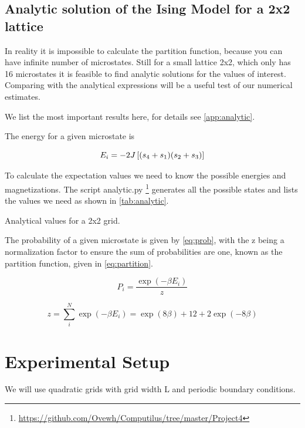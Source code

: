 \subsection{Analytic solution of the Ising Model for a 2x2 lattice}
In reality it is impossible to calculate the partition function, because you can
have infinite number of microstates. Still for a small lattice 2x2, which only
has 16 microstates it is
feasible to find analytic solutions for the values of
interest. Comparing with the analytical expressions will be a useful test of our
numerical estimates.

We list the most important results here, for details see \cref{app:analytic}.

The energy for a given microstate is

\begin{equation}
  E_i = -2J\left[(s_4 + s_1)(s_2+s_3)\right]
\end{equation}

To calculate the expectation values we need to know the possible energies and
magnetizations. The script analytic.py
\footnote{\url{https://github.com/Ovewh/Computilus/tree/master/Project4}}
generates all the possible states and lists the values we need as shown in
\cref{tab:analytic}.

\begin{table}[htp]
  \centering
  \caption{Analytical values for a 2x2 grid.}
  \label{tab:analytic}
\end{table}

The probability of a given microstate is given by \cref{eq:prob}, with the z
being a normalization factor to ensure the sum of probabilities are one, known
as the partition function, given in \cref{eq:partition}.


\begin{equation}
  \label{eq:prob}
  P_i = \frac{\exp(-\beta E_i)}{z}
\end{equation}

\begin{equation}
  \label{eq:partition}
  z = \sum_{i}^{N} \exp(-\beta E_i) = \exp(8\beta) + 12 + 2\exp(-8\beta)
\end{equation}


\section{Experimental Setup}
We will
use quadratic grids with grid width L and periodic
boundary conditions.


